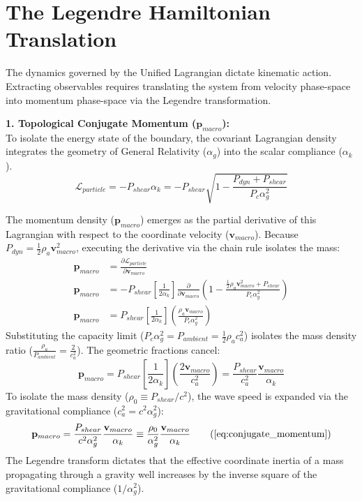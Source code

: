 \section{The Legendre Hamiltonian Translation}
\label{sec:deriv_legendre_hamiltonian}

The dynamics governed by the Unified Lagrangian dictate kinematic action. Extracting observables requires translating the system from velocity phase-space into momentum phase-space via the Legendre transformation. 

\textbf{1. Topological Conjugate Momentum ($\mathbf{p}_{macro}$):} \\
To isolate the energy state of the boundary, the covariant Lagrangian density integrates the geometry of General Relativity ($\alpha_g$) into the scalar compliance ($\alpha_k$).
\begin{equation}
    \mathcal{L}_{particle} = - P_{shear} \alpha_k = - P_{shear} \sqrt{1 - \frac{P_{dyn} + P_{shear}}{P_c \alpha_g^2}} \nonumber
\end{equation}

The momentum density ($\mathbf{p}_{macro}$) emerges as the partial derivative of this Lagrangian with respect to the coordinate velocity ($\mathbf{v}_{macro}$). Because $P_{dyn} = \frac{1}{2}\rho_a \mathbf{v}_{macro}^2$, executing the derivative via the chain rule isolates the mass: 
\begin{align}
    \mathbf{p}_{macro} &= \frac{\partial \mathcal{L}_{particle}}{\partial \mathbf{v}_{macro}} \nonumber \\
    \mathbf{p}_{macro} &= -P_{shear} \left[ \frac{1}{2\alpha_k} \right] \frac{\partial}{\partial \mathbf{v}_{macro}} \left( 1 - \frac{\frac{1}{2}\rho_a \mathbf{v}_{macro}^2 + P_{shear}}{P_c \alpha_g^2} \right) \nonumber \\
    \mathbf{p}_{macro} &= P_{shear} \left[ \frac{1}{2\alpha_k} \right] \left( \frac{\rho_a \mathbf{v}_{macro}}{P_c \alpha_g^2} \right) \nonumber
\end{align}
Substituting the capacity limit ($P_c \alpha_g^2 = P_{ambient} = \frac{1}{2} \rho_a c_a^2$) isolates the mass density ratio ($\frac{\rho_a}{P_{ambient}} = \frac{2}{c_a^2}$). The geometric fractions cancel:
\begin{equation}
    \mathbf{p}_{macro} = P_{shear} \left[ \frac{1}{2\alpha_k} \right] \left( \frac{2 \mathbf{v}_{macro}}{c_a^2} \right) = \frac{P_{shear}}{c_a^2} \frac{\mathbf{v}_{macro}}{\alpha_k} \nonumber
\end{equation}
To isolate the mass density ($\rho_0 \equiv P_{shear}/c^2$), the wave speed is expanded via the gravitational compliance ($c_a^2 = c^2 \alpha_g^2$):
\begin{equation}
    \mathbf{p}_{macro} = \frac{P_{shear}}{c^2 \alpha_g^2} \frac{\mathbf{v}_{macro}}{\alpha_k} \equiv \frac{\rho_0}{\alpha_g^2} \frac{\mathbf{v}_{macro}}{\alpha_k} \tag{\ref{eq:conjugate_momentum}}
\end{equation}
The Legendre transform dictates that the effective coordinate inertia of a mass propagating through a gravity well increases by the inverse square of the gravitational compliance ($1/\alpha_g^2$).

